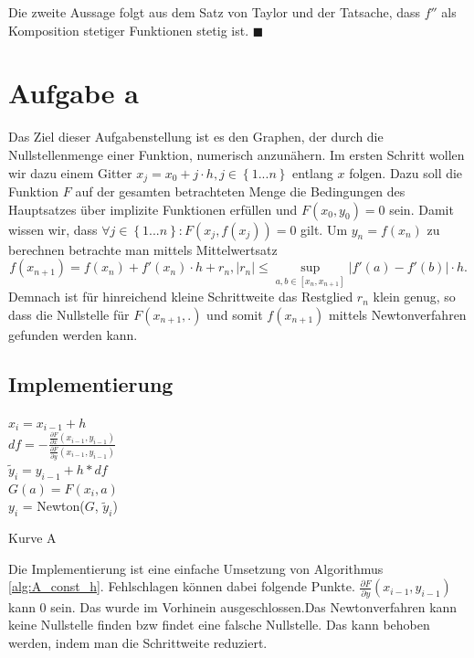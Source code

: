 \documentclass[a4paper,11pt,bibliography=totoc,listof=totoc,headinclude=true,cleardoublepage=empty,oneside]{scrartcl}
\newcommand{\diff}[2]{\frac{\partial #1}{\partial #2}}
\newcounter{satz}
\begin{document}
Die zweite Aussage folgt aus dem Satz von Taylor und der Tatsache, dass $f''$ als Komposition stetiger Funktionen stetig ist. \hfill $\blacksquare$

\section{Aufgabe a}
Das Ziel dieser Aufgabenstellung ist es den Graphen, der durch die Nullstellenmenge einer Funktion, numerisch anzunähern. Im ersten Schritt wollen wir dazu einem Gitter $x_j = x_0 + j\cdot h, j \in \left\lbrace1...n\right\rbrace $ entlang $x$ folgen. 
Dazu soll die Funktion $F$ auf der gesamten betrachteten Menge die Bedingungen des Hauptsatzes über implizite Funktionen erfüllen und $F(x_0,y_0)=0$ sein. Damit wissen wir, dass $\forall j \in \left\lbrace1...n\right\rbrace: F(x_j,f(x_j))=0$ gilt. Um $y_n = f(x_n)$ zu berechnen betrachte man mittels Mittelwertsatz
\[
f(x_{n+1})=f(x_n)+f'(x_n) \cdot h+r_n, \left|r_n\right|\leq \sup\limits_{a,b \in \left[x_n,x_{n+1}\right]}\left|{f'(a)-f'(b)}\right| \cdot h.
\]
Demnach ist für hinreichend kleine Schrittweite das Restglied $r_n$ klein genug, so dass die Nullstelle für $F(x_{n+1},.)$ und somit $f(x_{n+1})$ mittels Newtonverfahren gefunden werden kann.
\subsection{Implementierung}
\begin{algorithm}
	\label{alg:A_const_h}
	{
		$x_i = x_{i-1}+h$\\
		$df = -\frac{\diff{F}{x}(x_{i-1},y_{i-1})}{\diff{F}{y}(x_{i-1},y_{i-1})}$\\
		$\tilde y_i = y_{i-1}+h*df$\\
		$G(a) = F(x_i,a)$\\
		$y_i$ = Newton($G$, $\tilde y_i$)
	}
	\caption{Kurve A}
\end{algorithm}
Die Implementierung ist eine einfache Umsetzung von Algorithmus \ref{alg:A_const_h}.
Fehlschlagen können dabei folgende Punkte. $\diff{F}{y}(x_{i-1},y_{i-1})$ kann 0 sein. Das wurde im Vorhinein ausgeschlossen.Das Newtonverfahren kann keine Nullstelle finden bzw findet eine falsche Nullstelle. Das kann behoben werden, indem man die Schrittweite reduziert.
\end{document}

